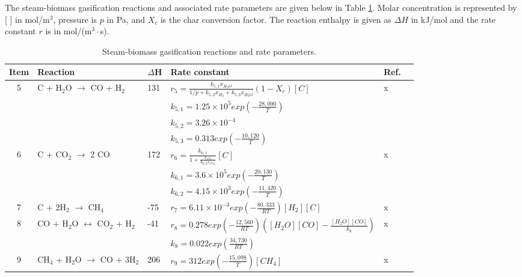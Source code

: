 \documentclass[12pt,titlepage]{article}
\begin{document}
The steam-biomass gasification reactions and associated rate parameters are given below in Table \ref{tab:gasification}. Molar concentration is represented by [ ] in mol/m$^3$, pressure is $p$ in Pa, and $X_c$ is the char conversion factor. The reaction enthalpy is given as $\Delta H$ in kJ/mol and the rate constant $r$ is in mol/(m$^3 \cdot$s).

\begin{table}[ht]
    \caption{Steam-biomass gasification reactions and rate parameters.}
    \label{tab:gasification}
    \begin{adjustwidth}{-0.5in}{-0.5in}
    \centering
    \small
    \begin{tabular}{clllll}
        \toprule
        Item & Reaction & $\Delta$H & Rate constant & Ref. \\
        \midrule
        5 & C + H$_2$O $\rightarrow$ CO + H$_2$ & 131 & $\displaystyle r_5 = \frac{k_{5,1} x_{H_2O}}{1/p + k_{5,2} x_{H_2} + k_{5,3} x_{H_2O}} (1 - X_c) [C]$ & x \\[1.5em]
          & & & $\displaystyle k_{5,1} = 1.25 \times 10^5 exp\left( -\frac{28,000}{T} \right)$ & \\[1em]
          & & & $\displaystyle k_{5,2} = 3.26 \times 10^{-4}$ & \\[1em]
          & & & $\displaystyle k_{5,3} = 0.313 exp \left( -\frac{10,120}{T} \right)$ & \\[1em]
        6 & C + CO$_2$ $\rightarrow$ 2 CO & 172 & $\displaystyle r_6 = \frac{k_{6,1}}{1 + \frac{x_{CO}}{k_{6,2} x_{CO_2}}} [C]$ & x \\[1.5em]
          & & & $\displaystyle k_{6,1} = 3.6 \times 10^5 exp \left( -\frac{20,130}{T} \right)$ & \\[1em]
          & & & $\displaystyle k_{6,2} = 4.15 \times 10^3 exp \left( -\frac{11,420}{T} \right)$ & \\[1em]
        7 & C + 2H$_2$ $\rightarrow$ CH$_4$ & -75 & $\displaystyle r_7 = 6.11 \times 10^{-3} exp \left( -\frac{80,333}{R T} \right) [H_2][C]$ & x \\[1.5em]
        8 & CO + H$_2$O $\leftrightarrow$ CO$_2$ + H$_2$ & -41 & $\displaystyle r_8 = 0.278 exp \left(-\frac{12,560}{R T} \right) \left([H_2O][CO] - \frac{[H_2O][CO]}{k_8} \right)$ & x \\[1em]
          & & & $\displaystyle k_8 = 0.022 exp \left( \frac{34,730}{R T} \right)$ & \\[1em]
        9 & CH$_4$ + H$_2$O $\rightarrow$ CO + 3H$_2$ & 206 & $\displaystyle r_9 = 312 exp \left( -\frac{15,098}{T} \right) [CH_4]$ & x \\[1.5em]
        \bottomrule
    \end{tabular}
    \end{adjustwidth}
\end{table}
\end{document}
